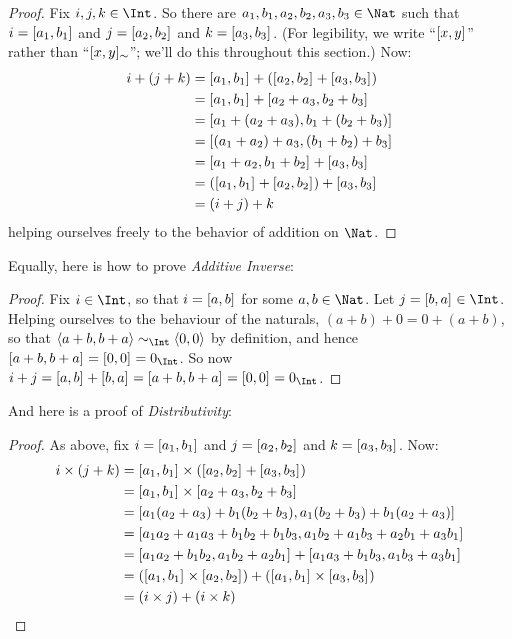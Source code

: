 \documentclass[../../../include/open-logic-section]{subfiles}
\begin{document}
\begin{proof} 
Fix $i, j, k \in \Int$. So there are $a_1, b_1, a_2, b_2, a_3, b_3 \in
\Nat$ such that $i = [a_1, b_1]_{}$ and $j =
[a_2,b_2]_{}$ and $k = [a_3, b_3]_{}$. (For
legibility, we write ``$[x, y]_{}$'' rather than
``$[x, y]_{\sim}$''; we'll do this throughout this
section.) Now:
\begin{align*}
	i + (j + k) &= [a_1, b_1]_{}+([a_2, b_2]_{} + [a_3, b_3]_{}) \\
	&= [a_1,  b_1]_{} + [a_2+a_3, b_2+b_3]_{}\\
	&= [a_1 + (a_2 + a_3), b_1 + (b_2 + b_3)]_{}\\
	&= [(a_1 + a_2) + a_3, (b_1 + b_2) + b_3]_{}\\
	&= [a_1 + a_2, b_1 + b_2]_{} + [a_3, b_3]_{}\\
	&= ([a_1, b_1]_{} + [a_2, b_2]_{}) + [a_3, b_3]_{}\\
	&= (i+j) + k
\end{align*}
helping ourselves freely to the behavior of addition on $\Nat$.
\end{proof}

Equally, here is how to prove \emph{Additive Inverse}:

\begin{proof}
Fix $i \in \Int$, so that $i = [a,b]_{}$ for some $a,b \in
\Nat$. Let $j = \equivrep{b,a}{} \in \Int$. Helping ourselves to the
behaviour of the naturals, $(a+b) + 0 = 0 + (a+b)$, so that
$\tuple{a+b, b+a} \sim_\Int \tuple{0,0}$ by definition, and hence
$\equivrep{a+b, b+a}{} = \equivrep{0, 0}{} = 0_\Int$. So now $i + j =
\equivrep{a,b}{}+\equivrep{b,a}{}=\equivrep{a+b, b+a}{}= \equivrep{0,
0}{} = 0_\Int$.
\end{proof}

And here is a proof of \emph{Distributivity}:

\begin{proof}
As above, fix $i = [a_1, b_1]_{}$ and $j =
[a_2,b_2]_{}$ and $k = [a_3, b_3]_{}$. Now:
\begin{align*}
	i \times (j + k) 
	&= [a_1, b_1]_{} \times ([a_2,b_2]_{} + [a_3, b_3]_{})\\
	&= [a_1, b_1]_{} \times [a_2 + a_3,b_2+b_3]_{}\\
	&= [a_1  (a_2 + a_3) + b_1  (b_2+b_3), a_1  (b_2 + b_3) + b_1 (a_2 + a_3)]_{}\\
	&= [a_1 a_2 + a_1a_3 + b_1 b_2+b_1b_3, a_1 b_2 + a_1b_3 + a_2b_1 + a_3b_1]_{}\\		
	&= [a_1a_2 + b_1b_2, a_1b_2 + a_2b_1]_{} + [a_1a_3 + b_1b_3, a_1b_3 + a_3b_1]_{}\\
	&= ([a_1, b_1]_{} \times [a_2,b_2]_{}) + ([a_1, b_1]_{} \times  [a_3, b_3]_{})\\
	&= (i \times j) + (i \times k)
\end{align*}
\end{proof}
\end{document}
